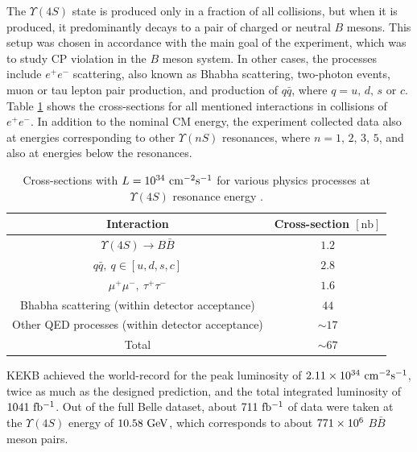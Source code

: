 The $\Upsilon(4S)$ state is produced only in a fraction of all collisions, but when it is produced, it predominantly decays to a pair of charged or neutral $B$ mesons. This setup was chosen in accordance with the main goal of the experiment, which was to study CP
violation in the $B$ meson system. In other cases, the processes include $e^+e^-$ scattering, also known as Bhabha scattering, two-photon events, muon or tau lepton pair production, and production of $q \bar q$, where $q=u,\,d,\,s$ or $c$. Table \ref{tab:xsec} shows the cross-sections for all mentioned interactions in collisions of $e^+e^-$.
In addition to the nominal CM energy, the experiment collected data also at energies
corresponding to other $\Upsilon(nS)$ resonances, where $n = 1,\,2,\,3,\,5$, and also at energies below the resonances.

\begin{table}[H]
	\centering
	\begin{tabular}{c|c}
		Interaction & Cross-section $[\mathrm{nb}]$ \\ 
		\toprule
		$\Upsilon(4S) \to B \bar B$ & $1.2$ \\
		$q \bar q,~q \in [u,d,s,c]$ & $2.8$ \\
		$\mu^+\mu^-,~\tau^+\tau^-$ & $1.6$ \\
		Bhabha scattering (within detector acceptance)& $44$ \\
		Other QED processes (within detector acceptance)& $\sim 17$ \\
		\midrule
		Total & $\sim 67$ \\
		\bottomrule
	\end{tabular}
	\caption{Cross-sections with $L=10^{34}\mathrm{~cm^{-2}s^{-1}}$ for various physics processes at $\Upsilon(4S)$ resonance energy \cite{ABASHIAN2002117}.}
	\label{tab:xsec}
\end{table}

KEKB achieved the world-record for the peak luminosity of $2.11\times 10^{34}\mathrm{~cm^{-2}s^{-1}}$, twice as much as the designed prediction, and the total integrated luminosity of $1041\mathrm{~fb^{-1}}$. Out of the full Belle dataset, about $711\mathrm{~fb^{-1}}$ of data were taken at the $\Upsilon(4S)$ energy of $10.58\mathrm{~GeV}$, which corresponds to about $771\times 10^{6}$ $B \bar B$ meson pairs.

